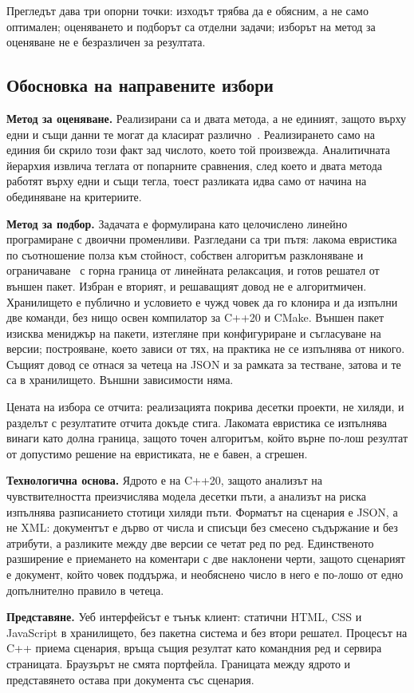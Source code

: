 Прегледът дава три опорни точки: изходът трябва да е обясним, а не само
оптимален; оценяването и подборът са отделни задачи; изборът на метод за
оценяване не е безразличен за резултата.

\subsection{Обосновка на направените избори}

\textbf{Метод за оценяване.} Реализирани са и двата метода, а не единият, защото
върху едни и същи данни те могат да класират
различно~\cite{triantaphyllou2000mcdm}. Реализирането само на единия би скрило
този факт зад числото, което той произвежда. Аналитичната йерархия извлича
теглата от попарните сравнения, след което и двата метода работят върху едни и
същи тегла, тоест разликата идва само от начина на обединяване на критериите.

\textbf{Метод за подбор.} Задачата е формулирана като целочислено линейно
програмиране с двоични променливи. Разгледани са три пътя: лакома евристика по
съотношение полза към стойност, собствен алгоритъм разклоняване и
ограничаване~\cite{land1960branch} с горна граница от линейната релаксация, и
готов решател от външен пакет. Избран е вторият, и решаващият довод не е
алгоритмичен. Хранилището е публично и условието е чужд човек да го клонира и да
изпълни две команди, без нищо освен компилатор за C++20 и CMake. Външен пакет
изисква мениджър на пакети, изтегляне при конфигуриране и съгласуване на версии;
построяване, което зависи от тях, на практика не се изпълнява от никого. Същият
довод се отнася за четеца на JSON и за рамката за тестване, затова и те са в
хранилището. Външни зависимости няма.

Цената на избора се отчита: реализацията покрива десетки проекти, не хиляди, и
разделът с резултатите отчита докъде стига. Лакомата евристика се изпълнява
винаги като долна граница, защото точен алгоритъм, който върне по-лош резултат от
допустимо решение на евристиката, не е бавен, а сгрешен.

\textbf{Технологична основа.} Ядрото е на C++20, защото анализът на
чувствителността преизчислява модела десетки пъти, а анализът на риска изпълнява
разписанието стотици хиляди пъти. Форматът на сценария е JSON, а не XML:
документът е дърво от числа и списъци без смесено съдържание и без атрибути, а
разликите между две версии се четат ред по ред. Единственото разширение е
приемането на коментари с две наклонени черти, защото сценарият е документ, който
човек поддържа, и необяснено число в него е по-лошо от едно допълнително правило
в четеца.

\textbf{Представяне.} Уеб интерфейсът е тънък клиент: статични HTML, CSS и
JavaScript в хранилището, без пакетна система и без втори решател. Процесът на
C++ приема сценария, връща същия резултат като командния ред и сервира
страницата. Браузърът не смята портфейла. Границата между ядрото и представянето
остава при документа със сценария.
